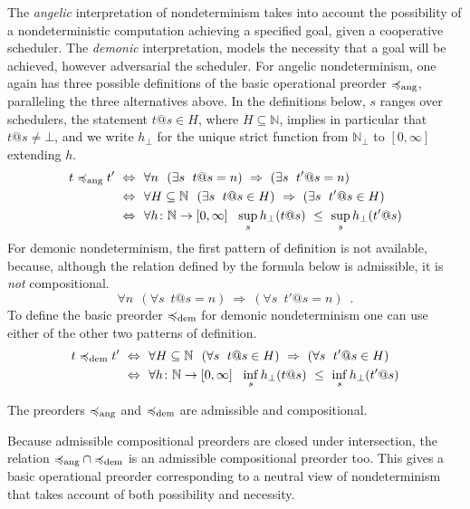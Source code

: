 The  \emph{angelic} interpretation of nondeterminism takes into account the possibility of a nondeterministic computation achieving a specified goal, given a cooperative scheduler.  The  \emph{demonic} interpretation, 
models the {necessity} that a goal will be achieved, however adversarial the scheduler. 
For angelic nondeterminism, one again has three possible definitions of the basic operational preorder
$\preccurlyeq_{\text{ang}}$, paralleling the three alternatives above. In the definitions below, $s$ ranges over schedulers, the statement $t@s \in H$, where $H \subseteq \mathbb{N}$, implies in particular that $t@s \neq\bot$, and we write $h_\bot$ for the unique strict function from $\mathbb{N}_\bot$ to
$[0,\infty]$ extending $h$.
\begin{align*}
t \preccurlyeq_{\text{ang}} t' ~ \Leftrightarrow ~ ~& \forall n ~~ (\exists s ~\; t@s =n)~ \Rightarrow~ (\exists s ~ \; t'@s =n) 
\\
~ \Leftrightarrow ~ ~& \forall H \subseteq \mathbb{N}~~ (\exists s ~\; t@s \in H)~ \Rightarrow~ (\exists s ~ \; t'@s \in H) 
\\
~ \Leftrightarrow ~ ~& \forall h\colon \mathbb{N}\to [0,\infty]~~ \sup_s h_\bot(t@s)~ \leq ~ \sup_s h_\bot(t'@s)
\end{align*}
For demonic nondeterminism, the first pattern of definition is not available, because, although  the relation defined by the formula below is admissible, it is  \emph{not} compositional.
\[
\forall n ~~ (\forall s ~\; t@s =n)~ \Rightarrow~ (\forall s ~ \; t'@s =n) \enspace .
\]
To define the basic preorder $\preccurlyeq_{\text{dem}}$ for demonic nondeterminism one can use either of the other two patterns of definition.
\begin{align*}
t \preccurlyeq_{\text{dem}} t' ~ \Leftrightarrow ~ ~& \forall H \subseteq \mathbb{N}~~ (\forall s ~ \; t@s \in H)~ \Rightarrow~ (\forall s ~ \; t'@s \in H) 
\\
~ \Leftrightarrow ~ ~& \forall h\colon \mathbb{N}\to [0,\infty]~~ \inf_s  h_\bot(t@s)~ \leq ~ \inf_s h_\bot(t'@s)
\end{align*}
\begin{proposition}
The preorders $\preccurlyeq_{\text{ang}}$  and $\preccurlyeq_{\text{dem}}$ are admissible and compositional. 
\end{proposition}
\noindent
Because admissible compositional preorders are closed under intersection, 
the relation ${\preccurlyeq_{\text{ang}}} \cap {\preccurlyeq_{\text{dem}}}$ is an admissible compositional preorder too. This gives a basic operational preorder corresponding to a neutral view of nondeterminism that takes account of both possibility and necessity.



